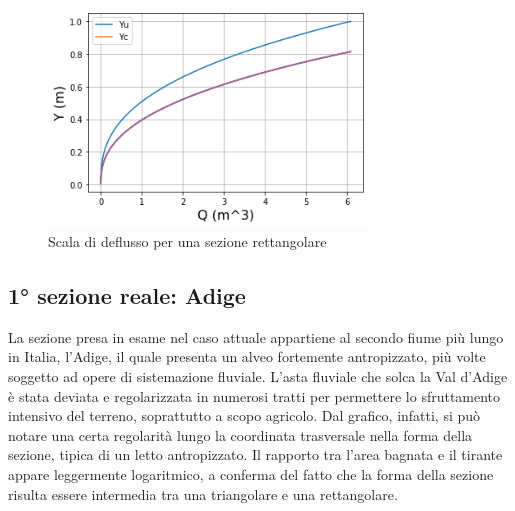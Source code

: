 \documentclass[12pt]{article} %
\begin{document}
\begin{figure}[H]
    \centering
    \includegraphics[width=8.5cm]{deflussotri.png}
    \caption{Scala di deflusso per una sezione rettangolare}
    \label{fig:rettangolare_scala_deflusso}
\end{figure}

\subsection{1° sezione reale: Adige}
\noindent La sezione presa in esame nel caso attuale appartiene al secondo fiume più lungo in Italia, l’Adige, il quale presenta un alveo fortemente antropizzato, più volte soggetto ad opere di sistemazione fluviale. 
L’asta fluviale che solca la Val d’Adige è stata deviata e regolarizzata in numerosi tratti per permettere lo sfruttamento intensivo del terreno, soprattutto a scopo agricolo. 
Dal grafico, infatti, si può notare una certa regolarità lungo la coordinata trasversale nella forma della sezione, tipica di un letto antropizzato. Il rapporto tra l’area bagnata e il tirante appare leggermente logaritmico, a conferma del fatto che la forma della sezione risulta essere intermedia tra una triangolare e una rettangolare.
\end{document}
